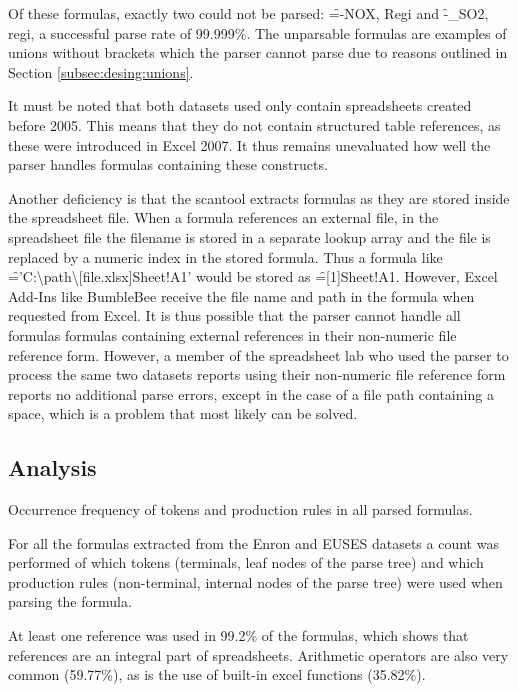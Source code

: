 Of these formulas, exactly two could not be parsed: \f{=-NOX, Regi} and \f{-_SO2, regi}, a successful parse rate of 99.999\%.
The unparsable formulas are examples of unions without brackets which the parser cannot parse due to reasons outlined in Section \ref{subsec:desing:unions}.
 
It must be noted that both datasets used only contain spreadsheets created before 2005.
This means that they do not contain structured table references, as these were introduced in Excel 2007.
It thus remains unevaluated how well the parser handles formulas containing these constructs.

Another deficiency is that the scantool extracts formulas as they are stored inside the spreadsheet file.
When a formula references an external file, in the spreadsheet file the filename is stored in a separate lookup array and the file is replaced by a numeric index in the stored formula.
Thus a formula like \f{='C:\textbackslash path\textbackslash [file.xlsx]Sheet!A1'} would be stored as \f{=[1]Sheet!A1}.
However, Excel Add-Ins like BumbleBee receive the file name and path in the formula when requested from Excel.
It is thus possible that the parser cannot handle all formulas formulas containing external references in their non-numeric file reference form.
However, a member of the spreadsheet lab who used the parser to process the same two datasets reports using their non-numeric file reference form reports no additional parse errors, except in the case of a file path containing a space, which is a problem that most likely can be solved.

\subsection{Analysis}

\begin{table}
	\centering
	\caption{Occurrence frequency of tokens and production rules in all parsed formulas.}
	\label{table:occurences}
\end{table}

For all the formulas extracted from the Enron and EUSES datasets a count was performed of which tokens (terminals, leaf nodes of the parse tree) and which production rules (non-terminal, internal nodes of the parse tree) were used when parsing the formula.

At least one reference was used in 99.2\% of the formulas, which shows that references are an integral part of spreadsheets.
Arithmetic operators are also very common (59.77\%), as is the use of built-in excel functions (35.82\%).

